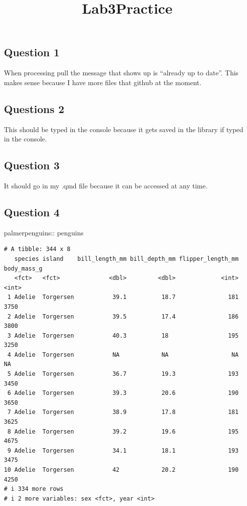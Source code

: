 \documentclass[
  letterpaper,
  DIV=11,
  numbers=noendperiod]{scrartcl}
\title{Lab3Practice}
\author{}
\date{}
\newenvironment{Shaded}{\begin{snugshade}}{\end{snugshade}}
\newcommand{\NormalTok}[1]{\textcolor[rgb]{0.00,0.23,0.31}{#1}}
\newcommand{\SpecialCharTok}[1]{\textcolor[rgb]{0.37,0.37,0.37}{#1}}
\begin{document}
\maketitle


\subsection{Question 1}\label{question-1}

When processing pull the message that shows up is ``already up to
date''. This makes sense because I have more files that github at the
moment.

\subsection{Questions 2}\label{questions-2}

This should be typed in the console because it gets saved in the library
if typed in the console.

\subsection{Question 3}\label{question-3}

It should go in my .qmd file because it can be accessed at any time.

\subsection{Question 4}\label{question-4}

\begin{Shaded}
\begin{Highlighting}[]
\NormalTok{palmerpenguins}\SpecialCharTok{::}\NormalTok{ penguins}
\end{Highlighting}
\end{Shaded}

\begin{verbatim}
# A tibble: 344 x 8
   species island    bill_length_mm bill_depth_mm flipper_length_mm body_mass_g
   <fct>   <fct>              <dbl>         <dbl>             <int>       <int>
 1 Adelie  Torgersen           39.1          18.7               181        3750
 2 Adelie  Torgersen           39.5          17.4               186        3800
 3 Adelie  Torgersen           40.3          18                 195        3250
 4 Adelie  Torgersen           NA            NA                  NA          NA
 5 Adelie  Torgersen           36.7          19.3               193        3450
 6 Adelie  Torgersen           39.3          20.6               190        3650
 7 Adelie  Torgersen           38.9          17.8               181        3625
 8 Adelie  Torgersen           39.2          19.6               195        4675
 9 Adelie  Torgersen           34.1          18.1               193        3475
10 Adelie  Torgersen           42            20.2               190        4250
# i 334 more rows
# i 2 more variables: sex <fct>, year <int>
\end{verbatim}
\end{document}
